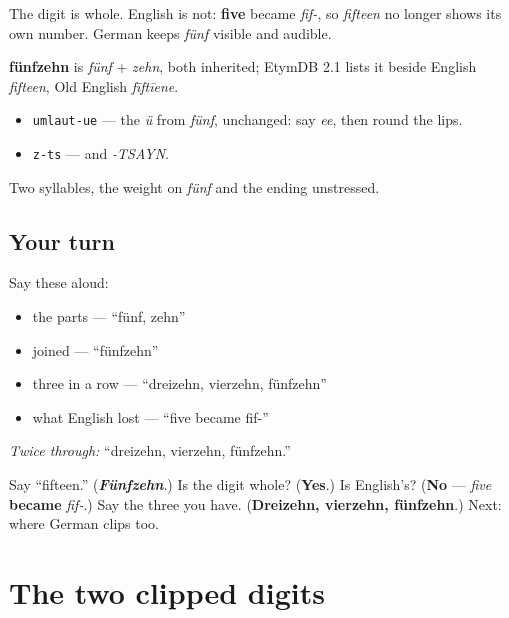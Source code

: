 The digit is whole. English is not: \textbf{five} became \emph{fif-}, so \emph{fifteen} no longer shows its own number. German keeps \emph{fünf} visible and audible.

\begin{cousinweb}
\textbf{fünfzehn} is \emph{fünf} + \emph{zehn}, both inherited; EtymDB 2.1 lists it beside English \emph{fifteen}, Old English \emph{fīftīene}.
\end{cousinweb}

\begin{sounds}
\begin{itemize}
\raggedright
  \item \texttt{umlaut-ue} — the \emph{ü} from \emph{fünf}, unchanged: say \emph{ee}, then round the lips.
  \item \texttt{z-ts} — and \emph{-TSAYN}.
\end{itemize}

Two syllables, the weight on \emph{fünf} and the ending unstressed.
\end{sounds}

\subsection*{Your turn}
Say these aloud:

\begin{itemize}
\raggedright
  \item the parts — \textquotedblleft{}fünf, zehn\textquotedblright{}
  \item joined — \textquotedblleft{}fünfzehn\textquotedblright{}
  \item three in a row — \textquotedblleft{}dreizehn, vierzehn, fünfzehn\textquotedblright{}
  \item what English lost — \textquotedblleft{}five became fif-\textquotedblright{}
\end{itemize}

\emph{Twice through:} \textquotedblleft{}dreizehn, vierzehn, fünfzehn.\textquotedblright{}

\begin{tcolorbox}[breakable,colback=teal!4,colframe=teal!35!black,title={Before you move on}]
Say \textquotedblleft{}fifteen.\textquotedblright{} (\emph{\textbf{Fünfzehn}}.) Is the digit whole? (\textbf{Yes}.) Is English's? (\textbf{No} — \emph{five} \textbf{became} \emph{fif-}.) Say the three you have. (\textbf{Dreizehn, vierzehn, fünfzehn}.) Next: where German clips too.
\end{tcolorbox}
\section[die Klippung]{The two clipped digits}

